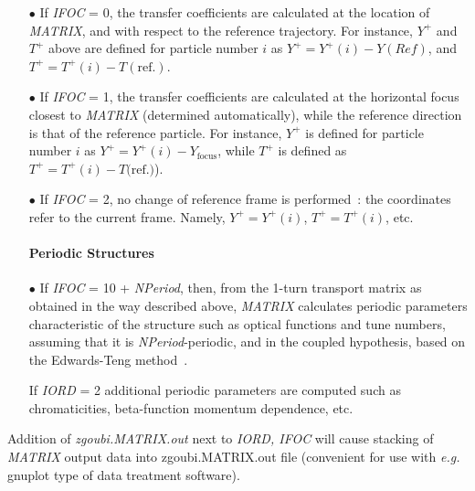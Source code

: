 \begin{itemize}
\item[$\bullet$] If \textsl{IFOC} = 0,  the transfer coefficients are calculated
at the location of \textsl{MATRIX}, and with respect to the reference trajectory. 
For instance, $ Y^+ $ and $ T^+ $ above are defined for particle number $ i $ as 
$Y^+=Y^+(i)-Y(Ref)$,  and $ T^+=T^+(i)-T(\textrm{ref.})$.  

\item[$\bullet$] If \textsl{IFOC} = 1, the transfer coefficients are calculated at the 
horizontal focus  closest to \textsl{MATRIX} (determined 
automatically), while the reference direction is that of the reference  particle. For 
instance, $ Y^+ $ is defined for particle number $ i $ as $ Y^+=Y^+(i) -Y_{\text{focus}} $, 
while  $ T^+ $ is defined as $ T^+=T^+(i)-T(\textrm{ref.)}$).  

\item[$\bullet$] If \textsl{IFOC} = 2, no change of reference frame is 
performed~: the coordinates refer to the current frame. Namely, $ Y^+=Y^+(i)$, 
$ T^+=T^+(i)$,  etc. \

\paragraph{\large Periodic Structures} 

\item[$\bullet$] If \textsl{IFOC} = 10  +  \textsl{NPeriod}, then, 
from the 1-turn transport matrix as obtained in the way described above,
 \textsl{MATRIX} calculates periodic parameters characteristic  of the structure 
such as  optical functions and tune numbers, assuming that it is \textsl{NPeriod}-periodic, 
and  in the coupled hypothesis, based on the Edwards-Teng method~\cite{Coupling}. 

If  \textsl{IORD} = 2 additional 
periodic parameters are computed such as chromaticities,  beta-function momentum dependence, 
 etc. 


\end{itemize}

 

\medskip

\noindent  Addition of \textsl{zgoubi.MATRIX.out} next to \textsl{IORD, IFOC} will cause 
stacking of \textsl{MATRIX} output data 
into   zgoubi.MATRIX.out file (convenient for use with \emph{e.g.} gnuplot type of data treatment software). 


